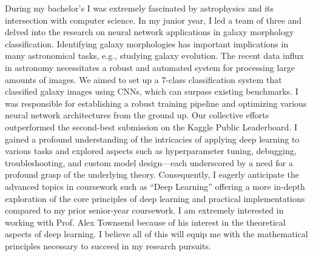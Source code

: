 \documentclass{article}
\begin{document}
\vspace{5pt} 
\hspace{0.25in}During my bachelor’s I was extremely fascinated by astrophysics
and its intersection with computer science. In my junior year, I led a team of
three and delved into the research on neural network applications in galaxy
morphology classification. Identifying galaxy morphologies has important
implications in many astronomical tasks, e.g., studying galaxy evolution. The
recent data influx in astronomy necessitates a robust and automated system for
processing large amounts of images. We aimed to set up a 7-class classification
system that classified galaxy images using CNNs, which can surpass existing
benchmarks. I was responsible for establishing a robust training pipeline and
optimizing various neural network architectures from the ground up. Our
collective efforts outperformed the second-best submission on the Kaggle Public
Leaderboard. I gained a profound understanding of the intricacies of applying
deep learning to various tasks and explored aspects such as hyperparameter
tuning, debugging, troubleshooting, and custom model design—each underscored by
a need for a profound grasp of the underlying theory. Consequently, I eagerly
anticipate the advanced topics in coursework such as “Deep Learning” offering a
more in-depth exploration of the core principles of deep learning and practical
implementations compared to my prior senior-year coursework. I am extremely
interested in working with Prof. Alex Townsend because of his interest in the
theoretical aspects of deep learning. I believe all of this will equip me with
the mathematical principles necessary to succeed in my research pursuits.
\end{document}
